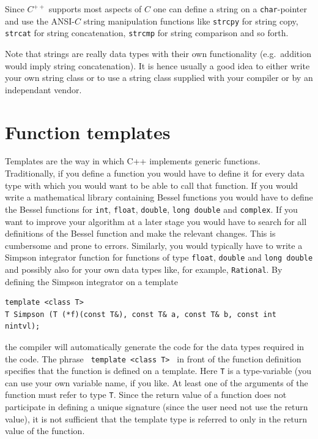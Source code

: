 Since $C^{++}$ supports most aspects of $C$ one can define a string on a
\verb+char+-pointer and use the ANSI-$C$ string manipulation functions like
\verb+strcpy+ for string copy, \verb+strcat+ for string concatenation,
\verb+strcmp+ for string comparison and so forth.

Note that strings are really data types with their own functionality (e.g.\ addition
would imply string concatenation). It is hence usually a good idea to either
write your own string class or to use a string class supplied with your compiler
or by an independant vendor.


\section{Function templates}

Templates are the way in which C++ implements generic functions.
Traditionally, if you define a function  you would have
to define it for every data type with which you would want to be able to call that
function. If you would write a mathematical library containing Bessel functions
you would have to define the Bessel functions for \verb+int+, \verb+float+,
\verb+double+, \verb+long double+ and \verb+complex+.
If you want to improve your algorithm at a later stage you would have to search
for all definitions of the Bessel function and make the relevant changes.
This is cumbersome and prone to errors. Similarly, you would typically have to
write a Simpson integrator function for functions of type \verb+float+, \verb+double+
and \verb+long double+ and possibly also for your own data types like, for example,
\verb+Rational+. By defining the Simpson integrator on a template
{\small \begin{verbatim}
template <class T>
T Simpson (T (*f)(const T&), const T& a, const T& b, const int nintvl);
\end{verbatim}}
\noindent
the compiler will automatically generate the code for the data types required
in the code. The phrase  \verb+ template <class T> + in front of the function
 definition specifies that the function is defined on a
template. Here \verb+T+ is a type-variable (you can use your own variable name,
if you like. At least one of the arguments of the function must refer to type \verb+T+.
 Since the return value of a function does not
participate in defining a unique signature (since the user need not use the return value), it
is not sufficient that the template type is referred to only in the return value of the
function.

